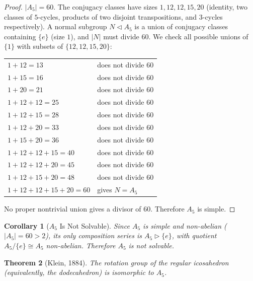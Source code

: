 \documentclass[11pt,a4paper]{article}
\theoremstyle{plain}
\newtheorem{theorem}{Theorem}[section]
\newtheorem{corollary}[theorem]{Corollary}
\theoremstyle{definition}
\begin{document}
\begin{proof}
$|A_{5}| = 60$.  The conjugacy classes have sizes $1, 12, 12, 15, 20$
(identity, two classes of $5$-cycles, products of two disjoint
transpositions, and $3$-cycles respectively).  A normal subgroup
$N \lhd A_{5}$ is a union of conjugacy classes containing $\{e\}$
(size $1$), and $|N|$ must divide $60$.  We check all possible unions
of $\{1\}$ with subsets of $\{12, 12, 15, 20\}$:

\begin{center}
\begin{tabular}{ll}
$1 + 12 = 13$ & does not divide 60 \\
$1 + 15 = 16$ & does not divide 60 \\
$1 + 20 = 21$ & does not divide 60 \\
$1 + 12 + 12 = 25$ & does not divide 60 \\
$1 + 12 + 15 = 28$ & does not divide 60 \\
$1 + 12 + 20 = 33$ & does not divide 60 \\
$1 + 15 + 20 = 36$ & does not divide 60 \\
$1 + 12 + 12 + 15 = 40$ & does not divide 60 \\
$1 + 12 + 12 + 20 = 45$ & does not divide 60 \\
$1 + 12 + 15 + 20 = 48$ & does not divide 60 \\
$1 + 12 + 12 + 15 + 20 = 60$ & gives $N = A_{5}$
\end{tabular}
\end{center}
No proper nontrivial union gives a divisor of $60$.  Therefore $A_{5}$
is simple.
\end{proof}

\begin{corollary}[$A_{5}$ Is Not Solvable]\label{cor:a5-not-solvable}
Since $A_{5}$ is simple and non-abelian ($|A_{5}| = 60 > 2$), its only
composition series is $A_{5} \rhd \{e\}$, with quotient
$A_{5}/\{e\} \cong A_{5}$ non-abelian.  Therefore $A_{5}$ is not
solvable.
\end{corollary}

\begin{theorem}[Klein, 1884]\label{thm:klein}
The rotation group of the regular icosahedron (equivalently, the
dodecahedron) is isomorphic to $A_{5}$.
\end{theorem}
\end{document}
